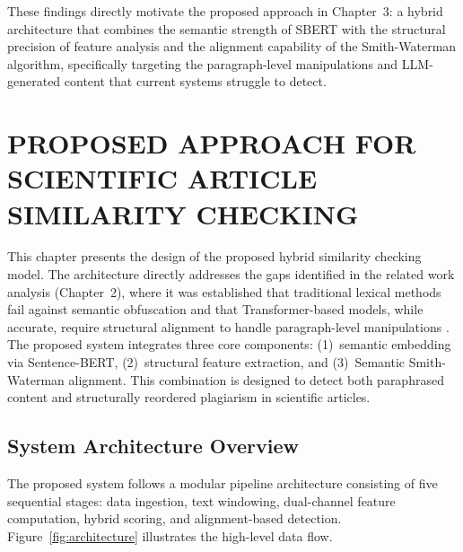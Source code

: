\documentclass[12pt, a4paper]{article}
\begin{document}
These findings directly motivate the proposed approach in Chapter~3: a hybrid architecture that combines the semantic strength of SBERT with the structural precision of feature analysis and the alignment capability of the Smith-Waterman algorithm, specifically targeting the paragraph-level manipulations and LLM-generated content that current systems struggle to detect.

\newpage
\section{PROPOSED APPROACH FOR SCIENTIFIC ARTICLE SIMILARITY CHECKING}

This chapter presents the design of the proposed hybrid similarity checking model. The architecture directly addresses the gaps identified in the related work analysis (Chapter~2), where it was established that traditional lexical methods fail against semantic obfuscation and that Transformer-based models, while accurate, require structural alignment to handle paragraph-level manipulations \citep{Antonius2023, Saqaabi2025}. The proposed system integrates three core components: (1)~semantic embedding via Sentence-BERT, (2)~structural feature extraction, and (3)~Semantic Smith-Waterman alignment. This combination is designed to detect both paraphrased content and structurally reordered plagiarism in scientific articles.

\subsection{System Architecture Overview}

The proposed system follows a modular pipeline architecture consisting of five sequential stages: data ingestion, text windowing, dual-channel feature computation, hybrid scoring, and alignment-based detection. Figure~\ref{fig:architecture} illustrates the high-level data flow.
\end{document}
